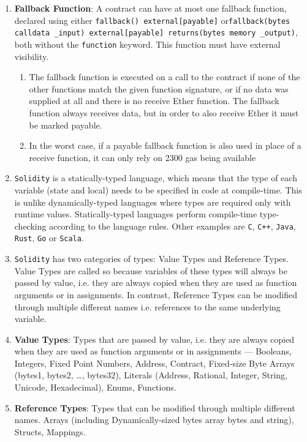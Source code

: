 \begin{enumerate}
\item\textbf{Fallback Function}: A contract can have at most one fallback function, declared using either \verb|fallback() external[payable]| or\linebreak\verb|fallback(bytes calldata _input) external[payable] returns(bytes memory _output)|, both without the \verb|function| keyword. This function must have external visibility.
    \begin{enumerate}
    \item The fallback function is executed on a call to the contract if none of the other functions match the given function signature, or if no data was supplied at all and there is no receive Ether function. The fallback function always receives data, but in order to also receive Ether it must be marked payable.
    \item In the worst case, if a payable fallback function is also used in place of a receive function, it can only rely on 2300 gas being available
    \end{enumerate}

\item\verb|Solidity| is a statically-typed language, which means that the type of each variable (state and local) needs to be specified in code at compile-time. This is unlike dynamically-typed languages where types are required only with runtime values. Statically-typed languages perform compile-time type-checking according to the language rules. Other examples are \verb|C|, \verb|C++|, \verb|Java|, \verb|Rust|, \verb|Go| or \verb|Scala|.

\item\verb|Solidity| has two categories of types: Value Types and Reference Types. Value Types are called so because variables of these types will always be passed by value, i.e. they are always copied when they are used as function arguments or in assignments. In contrast, Reference Types can be modified through multiple different names i.e. references to the same underlying variable.

\item\textbf{Value Types}: Types that are passed by value, i.e. they are always copied when they are used as function arguments or in assignments — Booleans, Integers, Fixed Point Numbers, Address, Contract, Fixed-size Byte Arrays (bytes1, bytes2, \dots, bytes32), Literals (Address, Rational, Integer, String, Unicode, Hexadecimal), Enums, Functions.

\item\textbf{Reference Types}: Types that can be modified through multiple different names. Arrays (including Dynamically-sized bytes array bytes and string), Structs, Mappings.


\end{enumerate}

